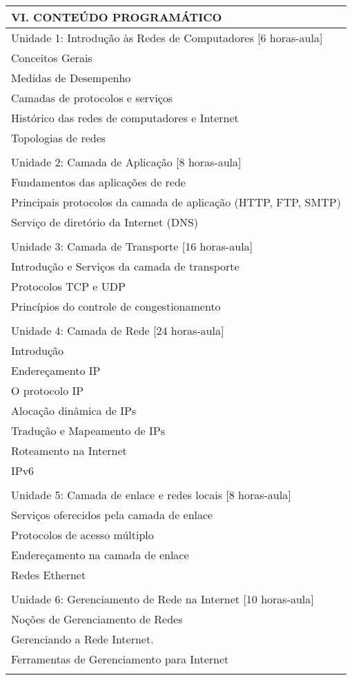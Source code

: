 \documentclass[12pt]{article}
\begin{document}
\begin{longtable}{|L{1.025\textwidth}|} \hline
%
{\bf VI. CONTEÚDO PROGRAMÁTICO } \\ \hline
Unidade 1: Introdução às Redes de Computadores [6 horas-aula]\\
Conceitos Gerais	\\
Medidas de Desempenho\\
Camadas de protocolos e serviços\\
Histórico das redes de computadores e Internet\\
Topologias de redes\\
\\
Unidade 2: Camada de Aplicação [8 horas-aula]\\
Fundamentos das aplicações de rede\\
Principais protocolos da camada de aplicação (HTTP, FTP, SMTP)\\
Serviço de diretório da Internet (DNS)\\
\\
Unidade 3: Camada de Transporte [16 horas-aula]\\
Introdução e Serviços da camada de transporte\\
Protocolos TCP e UDP\\
Princípios do controle de congestionamento\\
\\
Unidade 4: Camada de Rede [24 horas-aula]\\
Introdução\\
Endereçamento IP\\
O protocolo IP\\
Alocação dinâmica de IPs\\
Tradução e Mapeamento de IPs\\
Roteamento na Internet\\
IPv6\\
\\
Unidade 5: Camada de enlace e redes locais [8 horas-aula]\\
Serviços oferecidos pela camada de enlace\\
Protocolos de acesso múltiplo\\
Endereçamento na camada de enlace\\
Redes Ethernet\\
\\
Unidade 6: Gerenciamento de Rede na Internet [10 horas-aula] \\
Noções de Gerenciamento de Redes\\
Gerenciando a Rede Internet.\\
Ferramentas de Gerenciamento para Internet \\
\\ \hline
\end{longtable} 
\end{document}
